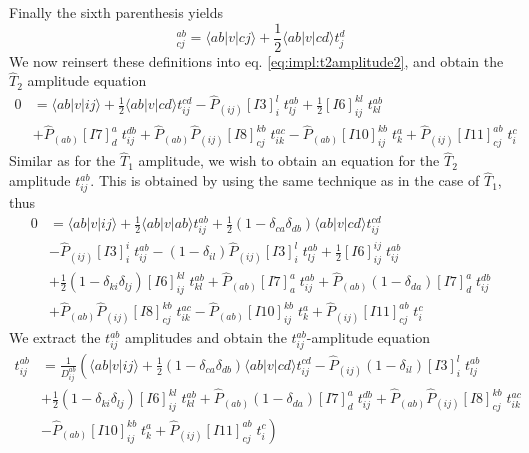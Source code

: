 Finally the sixth parenthesis yields
\begin{equation}
[I11]_{cj}^{ab} = \langle ab|v|cj\rangle +\frac{1}{2}\langle ab|v|cd\rangle t_j^d
\label{eq:impl:t2intermediates11}
\end{equation}
We now reinsert these definitions into eq. \ref{eq:impl:t2amplitude2}, and obtain the $\hat{T}_2$ amplitude equation
\begin{align}
0&=\langle ab|v|ij\rangle+\frac{1}{2}\langle ab|v|cd\rangle t_{ij}^{cd}-\hat{P}_{(ij)}[I3]_{i}^{l}\phantom{.}t_{lj}^{ab}+\frac{1}{2}[I6]_{ij}^{kl}\phantom{.}t_{kl}^{ab}\nonumber\\
&+\hat{P}_{(ab)}[I7]_{d}^{a}\phantom{.}t_{ij}^{db}+\hat{P}_{(ab)}\hat{P}_{(ij)}[I8]_{cj}^{kb}\phantom{.}t_{ik}^{ac}-\hat{P}_{(ab)}[I10]_{ij}^{kb}\phantom{.}t_{k}^{a}+\hat{P}_{(ij)}[I11]_{cj}^{ab}\phantom{.}t_{i}^{c}
\label{eq:impl:t2amplitude3}
\end{align}
Similar as for the $\hat{T}_1$ amplitude, we wish to obtain an equation for the $\hat{T}_2$ amplitude $t_{ij}^{ab}$. This is obtained by using the same technique as in the case of $\hat{T}_1$, thus
\begin{align}
0&=\langle ab|v|ij\rangle+\frac{1}{2}\langle ab|v|ab\rangle t_{ij}^{ab}+\frac{1}{2}(1-\delta_{ca}\delta_{db})\langle ab|v|cd\rangle t_{ij}^{cd}\nonumber\\
&-\hat{P}_{(ij)}[I3]_{i}^{i}\phantom{.}t_{ij}^{ab}-(1-\delta_{il})\hat{P}_{(ij)}[I3]_{i}^{l}\phantom{.}t_{lj}^{ab}+\frac{1}{2}[I6]_{ij}^{ij}\phantom{.}t_{ij}^{ab}\nonumber\\
&+\frac{1}{2}(1-\delta_{ki}\delta_{lj})[I6]_{ij}^{kl}\phantom{.}t_{kl}^{ab}+\hat{P}_{(ab)}[I7]_{a}^{a}\phantom{.}t_{ij}^{ab}+\hat{P}_{(ab)}(1-\delta_{da})[I7]_{d}^{a}\phantom{.}t_{ij}^{db}\nonumber\\
&+\hat{P}_{(ab)}\hat{P}_{(ij)}[I8]_{cj}^{kb}\phantom{.}t_{ik}^{ac} -\hat{P}_{(ab)}[I10]_{ij}^{kb}\phantom{.}t_{k}^{a}+\hat{P}_{(ij)}[I11]_{cj}^{ab}\phantom{.}t_{i}^{c}
\label{eq:impl:t2amplitude4}
\end{align}
We extract the $t_{ij}^{ab}$ amplitudes and obtain the $t_{ij}^{ab}$-amplitude equation
\begin{align}
t_{ij}^{ab}&=\frac{1}{D_{ij}^{ab}}\left(\langle ab|v|ij\rangle+\frac{1}{2}(1-\delta_{ca}\delta_{db})\langle ab|v|cd\rangle t_{ij}^{cd}-\hat{P}_{(ij)}(1-\delta_{il})[I3]_{i}^{l}\phantom{.}t_{lj}^{ab}\right.\nonumber\\
&\left. +\frac{1}{2}(1-\delta_{ki}\delta_{lj})[I6]_{ij}^{kl}\phantom{.}t_{kl}^{ab}+\hat{P}_{(ab)}(1-\delta_{da})[I7]_{d}^{a}\phantom{.}t_{ij}^{db}+\hat{P}_{(ab)}\hat{P}_{(ij)}[I8]_{cj}^{kb}\phantom{.}t_{ik}^{ac}\right.\nonumber\\
&\left.-\hat{P}_{(ab)}[I10]_{ij}^{kb}\phantom{.}t_{k}^{a}+\hat{P}_{(ij)}[I11]_{cj}^{ab}\phantom{.}t_{i}^{c}\right)
\label{eq:impl:t2amplitude5}
\end{align}
